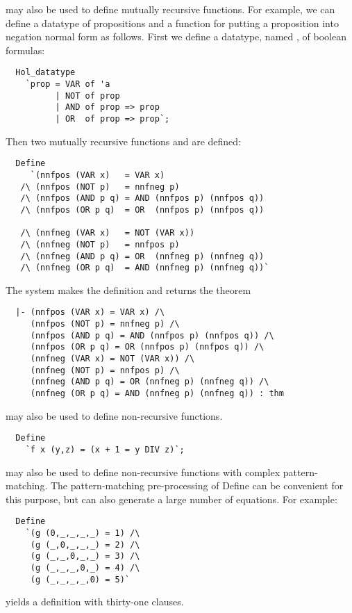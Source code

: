  may also be used to define mutually recursive functions.
For example, we can define a datatype of propositions and a function for
putting a proposition into negation normal form as follows.
First we define a datatype, named , of boolean formulas:
%
\begin{hol}
\begin{verbatim}
  Hol_datatype
    `prop = VAR of 'a
          | NOT of prop
          | AND of prop => prop
          | OR  of prop => prop`;
\end{verbatim}
\end{hol}
%
Then two mutually recursive functions  and 
are defined:
%
\begin{hol}
\begin{verbatim}
  Define
     `(nnfpos (VAR x)   = VAR x)
   /\ (nnfpos (NOT p)   = nnfneg p)
   /\ (nnfpos (AND p q) = AND (nnfpos p) (nnfpos q))
   /\ (nnfpos (OR p q)  = OR  (nnfpos p) (nnfpos q))

   /\ (nnfneg (VAR x)   = NOT (VAR x))
   /\ (nnfneg (NOT p)   = nnfpos p)
   /\ (nnfneg (AND p q) = OR  (nnfneg p) (nnfneg q))
   /\ (nnfneg (OR p q)  = AND (nnfneg p) (nnfneg q))`
\end{verbatim}
\end{hol}
%
The system makes the definition and returns the theorem
%
\begin{hol}
\begin{verbatim}
  |- (nnfpos (VAR x) = VAR x) /\
     (nnfpos (NOT p) = nnfneg p) /\
     (nnfpos (AND p q) = AND (nnfpos p) (nnfpos q)) /\
     (nnfpos (OR p q) = OR (nnfpos p) (nnfpos q)) /\
     (nnfneg (VAR x) = NOT (VAR x)) /\
     (nnfneg (NOT p) = nnfpos p) /\
     (nnfneg (AND p q) = OR (nnfneg p) (nnfneg q)) /\
     (nnfneg (OR p q) = AND (nnfneg p) (nnfneg q)) : thm
\end{verbatim}
\end{hol}

\ml{Define} may also be used to define non-recursive functions.
%
\begin{hol}
\begin{verbatim}
  Define
    `f x (y,z) = (x + 1 = y DIV z)`;
\end{verbatim}
\end{hol}

\ml{Define} may also be used to define non-recursive functions
with complex pattern-matching. The pattern-matching pre-processing of
{Define} can be convenient for this purpose, but can also generate a
large number of equations. For example:
%
\begin{hol}
\begin{verbatim}
  Define
    `(g (0,_,_,_,_) = 1) /\
     (g (_,0,_,_,_) = 2) /\
     (g (_,_,0,_,_) = 3) /\
     (g (_,_,_,0,_) = 4) /\
     (g (_,_,_,_,0) = 5)`
\end{verbatim}
\end{hol}
%
yields a definition with thirty-one clauses.


